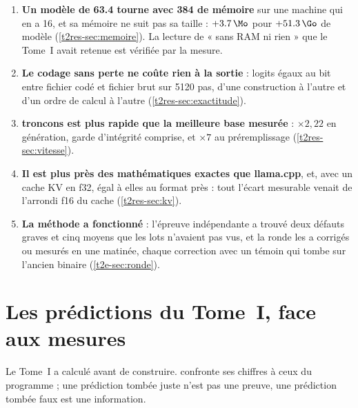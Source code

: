 \begin{enumerate}
\item \textbf{Un modèle de \SI{63.4}{\Go} tourne avec \SI{384}{\Mo} de mémoire} sur une machine qui en a 16, et sa mémoire ne suit pas sa taille : $+\SI{3.7}{\Mo}$ pour $+\SI{51.3}{\Go}$ de modèle (\cref{t2res-sec:memoire}). La lecture de « sans RAM ni rien » que le Tome~I avait retenue est vérifiée par la mesure.
\item \textbf{Le codage sans perte ne coûte rien à la sortie} : logits égaux au bit entre fichier codé et fichier brut sur \num{5120} pas, d'une construction à l'autre et d'un ordre de calcul à l'autre (\cref{t2res-sec:exactitude}).
\item \textbf{troncons est plus rapide que la meilleure base mesurée} : $\times 2{,}22$ en génération, garde d'intégrité comprise, et $\times 7$ au préremplissage (\cref{t2res-sec:vitesse}).
\item \textbf{Il est plus près des mathématiques exactes que llama.cpp}, et, avec un cache KV en f32, égal à elles au format près : tout l'écart mesurable venait de l'arrondi f16 du cache (\cref{t2res-sec:kv}).
\item \textbf{La méthode a fonctionné} : l'épreuve indépendante a trouvé deux défauts graves et cinq moyens que les lots n'avaient pas vus, et la ronde les a corrigés ou mesurés en une matinée, chaque correction avec un témoin qui tombe sur l'ancien binaire (\cref{t2e-sec:ronde}).
\end{enumerate}

\section{Les prédictions du Tome~I, face aux mesures}\label{t2d-sec:predictions}

Le Tome~I a calculé avant de construire.  confronte ses chiffres à ceux du programme ; une prédiction tombée juste n'est pas une preuve, une prédiction tombée faux est une information.

